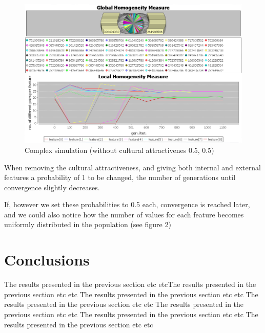 \documentclass[twoside, 11pt, a4paper]{article}
\begin{document}
\begin{figure}[htp]
		\centering
		\includegraphics[width=\textwidth]{fig2}
		\caption{Complex simulation (without cultural attractivenes 0.5, 0.5)}
		\label{Fig 2}
\end{figure}

When removing the cultural attractiveness, and giving both internal and external features a probability of 1 to be changed, the number of generations until convergence slightly decreases.

If, however we set these probabilities to 0.5 each, convergence is reached later, and we could also notice how the number of values for each feature becomes uniformly distributed in the population (see figure 2)





\section{Conclusions}

The results presented in the previous section  etc etcThe results presented in the previous section  etc etc
The results presented in the previous section  etc etc
The results presented in the previous section  etc etc
The results presented in the previous section  etc etc
The results presented in the previous section  etc etc
The results presented in the previous section  etc etc

\newpage
\pagebreak

\vskip 0.2in


\end{document}
